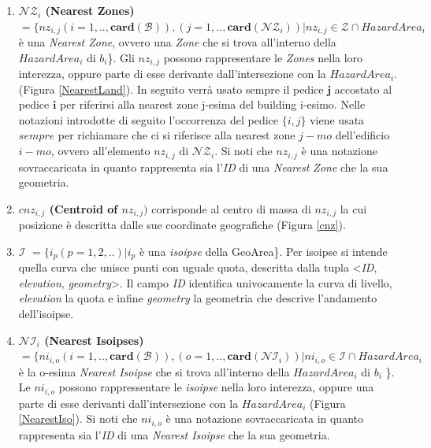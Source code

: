 \begin{enumerate}
	\item \textbf{$ \mathcal{NZ}_i $ (Nearest Zones)} $ = \{nz_{i,j}(i=1,..,\mathbf{card}( \mathcal{B} )), (j=1,..,\mathbf{card}(\mathcal{ NZ}_i)) | nz_{i,j} \in  \mathcal{Z}  \cap HazardArea_i $ è una \textit{Nearest Zone}, ovvero 	una \textit{Zone} che si trova all'interno della $HazardArea_i$ di $b_i$\}. Gli $nz_{i,j}$ possono rappresentare le \textit{Zones} nella loro interezza, oppure parte di esse derivante dall'intersezione con la $HazardArea_i$.  (Figura \ref{NearestLand}).
	In seguito verrà usato sempre il pedice $\mathbf{j}$ accostato al pedice $\mathbf{i}$ per riferirsi alla nearest zone j-esima del building i-esimo.
	Nelle notazioni introdotte di seguito l'occorrenza del pedice $\{i,j\}$ viene usata $sempre$ per richiamare che ci si riferisce alla nearest zone $j-mo$ dell'edificio $i-mo$, ovvero all'elemento $nz_{i,j}$ di $ \mathcal{NZ}_i $.
	Si noti che $nz_{i,j}$ è una notazione sovraccaricata in quanto rappresenta sia l’\textit{ID} di una \textit{Nearest Zone} che la sua geometria.
	
	\item \textbf{$ cnz_{i,j} $ (Centroid of $nz_{i,j})$} corrisponde al centro di massa di $nz_{i,j}$ la cui posizione è descritta dalle sue coordinate geografiche (Figura \ref{cnz}). 
	
	\item \textbf{$ \mathcal{I} $} $ = \{i_p(p=1,2,..) | i_p $ \`e una \textit{isoipse} della GeoArea\}. Per isoipse si intende quella curva che unisce punti con uguale quota, descritta dalla tupla <\textit{ID}, \textit{elevation}, \textit{geometry}>. Il campo \textit{ID} identifica univocamente la curva di livello, \textit{elevation} la quota  e infine \textit{geometry} la geometria che descrive l'andamento dell'isoipse.
	
	\item \textbf{$ \mathcal{NI}_i $ (Nearest Isoipses)} $ = \{ ni_{i,o}(i=1,..,\mathbf{card}( \mathcal{B} )), (o=1,. . ,\mathbf{card}(\mathcal{ NI}_i)) | ni_{i,o} \in  \mathcal{I}  \cap HazardArea_i$ è la o-esima \textit{Nearest Isoipse} che si trova all'interno della $HazardArea_i$ di $b_i$ \}. Le $ni_{i,o}$ possono rappressentare le \textit{isoipse} nella loro interezza, oppure una parte di esse derivanti dall'intersezione con la $HazardArea_i$  (Figura \ref{NearestIso}). Si noti che $ni_{i,o}$ è una notazione sovraccaricata in quanto rappresenta sia l’\textit{ID} di una \textit{Nearest Isoipse} che la sua geometria.
	

\end{enumerate}
